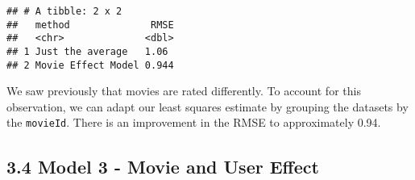 \documentclass[]{article}
\newenvironment{Shaded}{\begin{snugshade}}{\end{snugshade}}
\newcommand{\DataTypeTok}[1]{\textcolor[rgb]{0.13,0.29,0.53}{#1}}
\newcommand{\DecValTok}[1]{\textcolor[rgb]{0.00,0.00,0.81}{#1}}
\newcommand{\KeywordTok}[1]{\textcolor[rgb]{0.13,0.29,0.53}{\textbf{#1}}}
\newcommand{\NormalTok}[1]{#1}
\newcommand{\OperatorTok}[1]{\textcolor[rgb]{0.81,0.36,0.00}{\textbf{#1}}}
\newcommand{\StringTok}[1]{\textcolor[rgb]{0.31,0.60,0.02}{#1}}
\begin{document}
\begin{Shaded}
\end{Shaded}

\begin{verbatim}
## # A tibble: 2 x 2
##   method              RMSE
##   <chr>              <dbl>
## 1 Just the average   1.06 
## 2 Movie Effect Model 0.944
\end{verbatim}

We saw previously that movies are rated differently. To account for this
observation, we can adapt our least squares estimate by grouping the
datasets by the \texttt{movieId}. There is an improvement in the RMSE to
approximately 0.94.

\hypertarget{model-3---movie-and-user-effect-1}{%
\subsection{3.4 Model 3 - Movie and User
Effect}\label{model-3---movie-and-user-effect-1}}

\begin{Shaded}
\end{Shaded}
\end{document}
